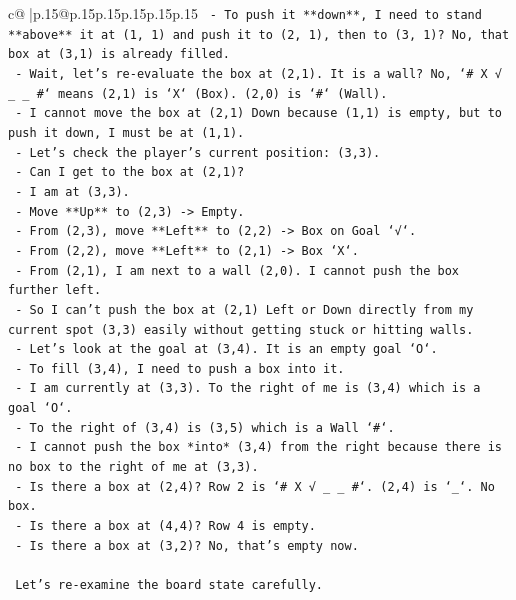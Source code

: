 \documentclass{article}
\begin{document}
{\begin{supertabular}{c@{$\;$}|p{.15\linewidth}@{}p{.15\linewidth}p{.15\linewidth}p{.15\linewidth}p{.15\linewidth}p{.15\linewidth}}
{{{\texttt{    {-} To push it **down**, I need to stand **above** it at (1, 1) and push it to (2, 1), then to (3, 1)? No, that box at (3,1) is already filled.} \\
\texttt{    {-} Wait, let's re{-}evaluate the box at (2,1). It is a wall? No, `\# X √ \_ \_ \#` means (2,1) is `X` (Box). (2,0) is `\#` (Wall).} \\
\texttt{    {-} I cannot move the box at (2,1) Down because (1,1) is empty, but to push it down, I must be at (1,1).} \\
\texttt{    {-} Let's check the player's current position: (3,3).} \\
\texttt{    {-} Can I get to the box at (2,1)?} \\
\texttt{        {-} I am at (3,3).} \\
\texttt{        {-} Move **Up** to (2,3) {-}> Empty.} \\
\texttt{        {-} From (2,3), move **Left** to (2,2) {-}> Box on Goal `√`.} \\
\texttt{        {-} From (2,2), move **Left** to (2,1) {-}> Box `X`.} \\
\texttt{        {-} From (2,1), I am next to a wall (2,0). I cannot push the box further left.} \\
\texttt{    {-} So I can't push the box at (2,1) Left or Down directly from my current spot (3,3) easily without getting stuck or hitting walls.} \\
\texttt{    {-} Let's look at the goal at (3,4). It is an empty goal `O`.} \\
\texttt{    {-} To fill (3,4), I need to push a box into it.} \\
\texttt{    {-} I am currently at (3,3). To the right of me is (3,4) which is a goal `O`.} \\
\texttt{    {-} To the right of (3,4) is (3,5) which is a Wall `\#`.} \\
\texttt{    {-} I cannot push the box *into* (3,4) from the right because there is no box to the right of me at (3,3).} \\
\texttt{    {-} Is there a box at (2,4)? Row 2 is `\# X √ \_ \_ \#`. (2,4) is `\_`. No box.} \\
\texttt{    {-} Is there a box at (4,4)? Row 4 is empty.} \\
\texttt{    {-} Is there a box at (3,2)? No, that's empty now.} \\
\\ 
\texttt{    Let's re{-}examine the board state carefully.} \\
}}}
\end{supertabular}}
\end{document}
